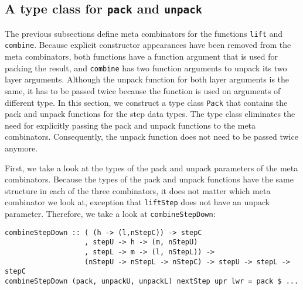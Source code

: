 \subsection{A type class for \texttt{pack} and \texttt{unpack}}
\label{subsecttypeclass}
\par The previous subsections define meta combinators for the functions
        \texttt{lift} and \texttt{combine}. Because explicit constructor appearances
        have been removed from the meta combinators, both functions have a function
        argument that is used for packing the result, and \texttt{combine} has two
        function arguments to unpack its two layer arguments. Although the unpack
        function for both layer arguments is the same, it has to be passed twice
        because the function is used on arguments of different type. In this section,
        we construct a type class \texttt{Pack} that contains the pack and unpack
        functions for the step data types. The type class eliminates the need for
        explicitly passing the pack and unpack functions to the meta combinators.
        Consequently, the unpack function does not need to be passed twice anymore.
        
\par First, we take a look at the types of the pack and unpack parameters
        of the meta combinators. Because the types of the pack and unpack functions
        have the same structure in each of the three combinators, it does not matter
        which meta combinator we look at, exception that \texttt{liftStep} does not
        have an unpack parameter. Therefore, we take a look at
        \texttt{combineStepDown}:\begin{small}\begin{verbatim}combineStepDown :: ( (h -> (l,nStepC)) -> stepC 
                   , stepU -> h -> (m, nStepU)
                   , stepL -> m -> (l, nStepL)) -> 
                   (nStepU -> nStepL -> nStepC) -> stepU -> stepL -> stepC
combineStepDown (pack, unpackU, unpackL) nextStep upr lwr = pack $ ...
\end{verbatim}\end{small}

